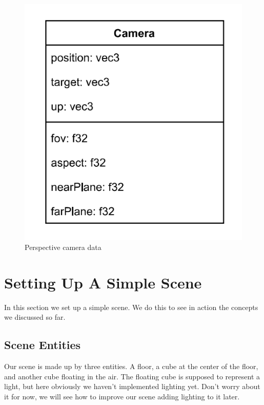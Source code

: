 \begin{figure}[ht]
    \centering
    \includegraphics[scale=0.40]{images/ChScene/CameraData.png}
    \caption{Perspective camera data}
    \label{fig::CameraData}
\end{figure}

\section{Setting Up A Simple Scene}

In this section we set up a simple scene.
We do this to see in action the concepts we discussed so far.

\subsection{Scene Entities}

Our scene is made up by three entities.
A floor, a cube at the center of the floor, and another cube floating in the air.
The floating cube is supposed to represent a light, but here obviously we haven't
implemented lighting yet.
Don't worry about it for now, we will see how to improve our scene adding lighting
to it later.

\begin{minipage}{\linewidth}{\noindent}
    
\end{minipage}

